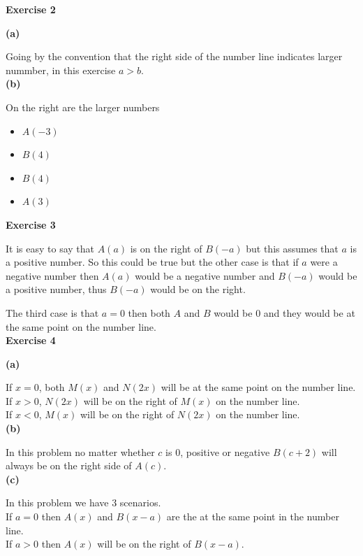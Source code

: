 \documentclass[10pt]{article}
\begin{document}
\textbf{Exercise 2}

\textbf{(a)}

Going by the convention that the right side of the number line indicates larger nummber, in this 
exercise $a > b$. \\

\textbf{(b)}

On the right are the larger numbers
\begin{itemize}
  \item $A(-3)$
  \item $B(4)$
  \item $B(4)$
  \item $A(3)$
\end{itemize}


\textbf{Exercise 3}

It is easy to say that $A(a)$ is on the right of $B(-a)$ but this assumes that $a$ is a positive number.
So this could be true but the other case is that if $a$ were a negative number then $A(a)$ would be a negative number 
and $B(-a)$ would be a positive number, thus $B(-a)$ would be on the right.

The third case is that $a = 0$ then both $A$ and $B$ would be 0 and they would be at the same point on the number line.\\


\textbf{Exercise 4}

\textbf{(a)}

If $x = 0$, both $M(x)$ and $N(2x)$ will be at the same point on the number line.\\

If $x > 0$, $N(2x)$ will be on the right of $M(x)$ on the number line.\\

If $x < 0$, $M(x)$ will be on the right of $N(2x)$ on the number line.\\


\textbf{(b)}

In this problem no matter whether $c$ is 0, positive or negative $B(c + 2)$ will always be on the right side 
of $A(c)$.\\

\textbf{(c)}

In this problem we have 3 scenarios.\\

If $a = 0$ then $A(x)$ and $B(x - a)$ are the at the same point in the number line.\\

If $a > 0$ then $A(x)$ will be on the right of $B(x - a)$.\\
\end{document}
